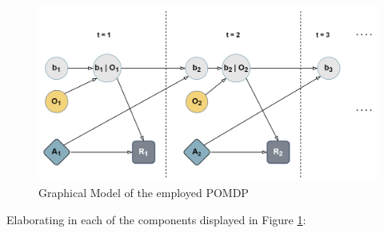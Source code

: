 \begin{figure}[H]
    \centering
	\includegraphics[width=0.8\linewidth]{Figures/pomdp.png}
	\caption{Graphical Model of the employed \acrshort{POMDP}}
	\label{pomdpFig}
\end{figure}

Elaborating in each of the components displayed in Figure \ref{pomdpFig}:

